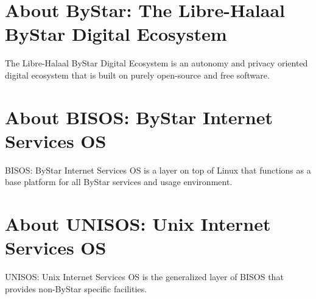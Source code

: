 \section{About ByStar: The Libre-Halaal ByStar Digital Ecosystem}

The Libre-Halaal ByStar Digital Ecosystem is an autonomy and privacy
oriented digital ecosystem that is built on purely open-source and
free software.

\begin{comment}
*  [[elisp:(org-cycle)][| ]] [[elisp:(org-show-subtree)][|=]] [[elisp:(show-children 10)][|V]] [[elisp:(bx:orgm:indirectBufOther)][|>]] [[elisp:(bx:orgm:indirectBufMain)][|I]] [[elisp:(blee:ppmm:org-mode-toggle)][|N]] [[elisp:(org-top-overview)][|O]] [[elisp:(progn (org-shifttab) (org-content))][|C]] [[elisp:(delete-other-windows)][|1]]  /Section/   About BISOS: ByStar Internet Services OS ::  [[elisp:(org-cycle)][| ]]
\end{comment}

\section{About BISOS: ByStar Internet Services OS}

BISOS: ByStar Internet Services OS is a layer on top of Linux that
functions as a base platform for all ByStar services and usage
environment.

\begin{comment}
*  [[elisp:(org-cycle)][| ]] [[elisp:(org-show-subtree)][|=]] [[elisp:(show-children 10)][|V]] [[elisp:(bx:orgm:indirectBufOther)][|>]] [[elisp:(bx:orgm:indirectBufMain)][|I]] [[elisp:(blee:ppmm:org-mode-toggle)][|N]] [[elisp:(org-top-overview)][|O]] [[elisp:(progn (org-shifttab) (org-content))][|C]] [[elisp:(delete-other-windows)][|1]]  /Section/   About UNISOS: Unix Internet Services OS ::  [[elisp:(org-cycle)][| ]]
\end{comment}

\section{About UNISOS: Unix Internet Services OS}

UNISOS: Unix Internet Services OS is the generalized layer of BISOS
that provides non-ByStar specific facilities.


